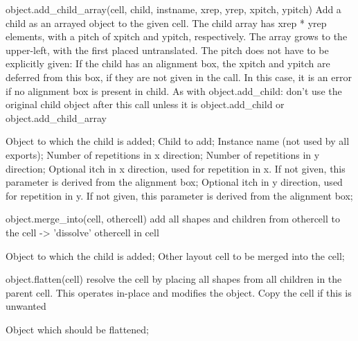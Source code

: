 \begin{APIfunc}{object.add\_child\_array(cell, child, instname, xrep, yrep, xpitch, ypitch)}
    Add a child as an arrayed object to the given cell. The child array has xrep * yrep elements, with a pitch of xpitch and ypitch, respectively. The array grows to the upper-left, with the first placed untranslated. The pitch does not have to be explicitly given: If the child has an alignment box, the xpitch and ypitch are deferred from this box, if they are not given in the call. In this case, it is an error if no alignment box is present in child. As with object.add\_child: don't use the original child object after this call unless it is object.add\_child or object.add\_child\_array
    \begin{APIparameters}
            Object to which the child is added;
            Child to add;
            Instance name (not used by all exports);
            Number of repetitions in x direction;
            Number of repetitions in y direction;
            Optional itch in x direction, used for repetition in x. If not given, this parameter is derived from the alignment box;
            Optional itch in y direction, used for repetition in y. If not given, this parameter is derived from the alignment box;
    \end{APIparameters}
\end{APIfunc}
\begin{APIfunc}{object.merge\_into(cell, othercell)}
    add all shapes and children from othercell to the cell -> 'dissolve' othercell in cell
    \begin{APIparameters}
            Object to which the child is added;
            Other layout cell to be merged into the cell;
    \end{APIparameters}
\end{APIfunc}
\begin{APIfunc}{object.flatten(cell)}
    resolve the cell by placing all shapes from all children in the parent cell. This operates in-place and modifies the object. Copy the cell if this is unwanted
    \begin{APIparameters}
            Object which should be flattened;
    \end{APIparameters}
\end{APIfunc}
